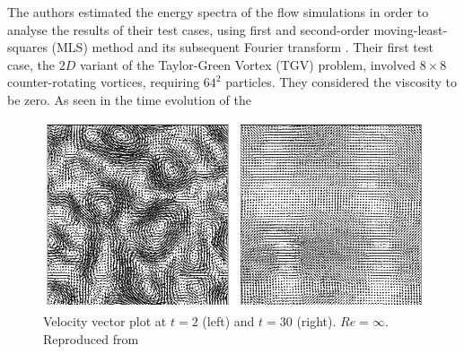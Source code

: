 The authors estimated the energy spectra of the flow simulations in order to analyse the results of their test cases, using first and second-order moving-least-squares (MLS) method \parencite{gossler2001moving} and its subsequent Fourier transform \parencite{frigo2005design}.
Their first test case, the $2D$ variant of the Taylor-Green Vortex (TGV) problem, involved $8\times 8$ counter-rotating vortices, requiring $64^2$ particles. They considered the viscosity to be zero.
As seen in the time evolution of the 
\begin{figure}[H]
    \centering
    \includegraphics[scale=0.7]{Figures/research_papers/adami2012-evolution-vel-field-tgv.png}
    \caption{Velocity vector plot at $t=2$ (left) and $t=30$ (right). $Re = \infty$. Reproduced from \cite{Adami2012} }
    \label{fig:adami2012-evolution-vel-field-tgv}
\end{figure}

